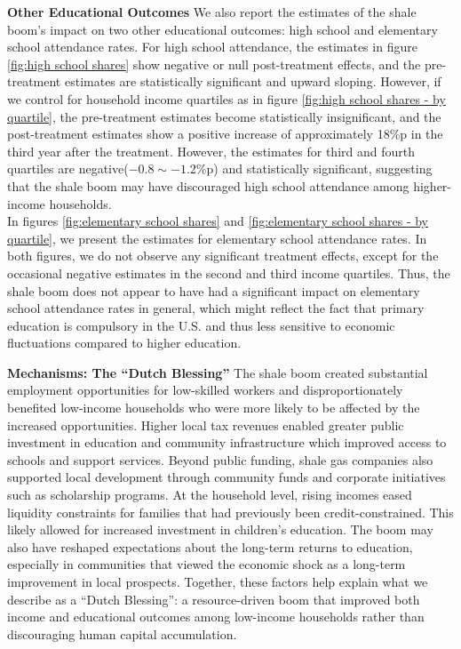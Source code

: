 \textbf{Other Educational Outcomes} \hspace{0.1cm} 
We also report the estimates of the shale boom's impact on two other educational outcomes: high school and elementary school attendance rates.
For high school attendance, the estimates in figure \ref{fig:high school shares} show negative or null post-treatment effects, and the pre-treatment estimates are statistically significant and upward sloping.
However, if we control for household income quartiles as in figure \ref{fig:high school shares - by quartile}, the pre-treatment estimates become statistically insignificant, 
and the post-treatment estimates show a positive increase of approximately 18\%p in the third year after the treatment.
However, the estimates for third and fourth quartiles are negative($-0.8\sim -1.2$\%p) and statistically significant, suggesting that the shale boom may have discouraged high school attendance among higher-income households.
\\
\indent In figures \ref{fig:elementary school shares} and \ref{fig:elementary school shares - by quartile}, 
we present the estimates for elementary school attendance rates.
In both figures, we do not observe any significant treatment effects, except for the occasional negative estimates in the second and third income quartiles.
Thus, the shale boom does not appear to have had a significant impact on elementary school attendance rates in general, 
which might reflect the fact that primary education is compulsory in the U.S. and thus less sensitive to economic fluctuations compared to higher education.

\textbf{Mechanisms: The “Dutch Blessing”} \hspace{0.1cm}
The shale boom created substantial employment opportunities for low-skilled workers and disproportionately benefited low-income households who were more likely to be affected by the increased opportunities. 
Higher local tax revenues enabled greater public investment in education and community infrastructure which improved access to schools and support services.
Beyond public funding, shale gas companies also supported local development through community funds and corporate initiatives such as scholarship programs.
At the household level, rising incomes eased liquidity constraints for families that had previously been credit-constrained.
This likely allowed for increased investment in children's education. The boom may also have reshaped expectations about the long-term returns to education, especially in communities that viewed the economic shock as a long-term improvement in local prospects.
Together, these factors help explain what we describe as a “Dutch Blessing”: a resource-driven boom that improved both income and educational outcomes among low-income households rather than discouraging human capital accumulation.

